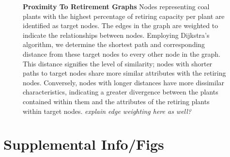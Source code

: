 \documentclass{article}
\begin{document}
\begin{figure}[H]
    \caption{\textbf{Proximity To Retirement Graphs} Nodes representing coal plants with the highest percentage of retiring capacity per plant are identified as target nodes. The edges in the graph are weighted to indicate the relationships between nodes. Employing Dijkstra's algorithm, we determine the shortest path and corresponding distance from these target nodes to every other node in the graph.
    This distance signifies the level of similarity; nodes with shorter paths to target nodes share more similar attributes with the retiring nodes. Conversely, nodes with longer distances have more dissimilar characteristics, indicating a greater divergence between the plants contained within them and the attributes of the retiring plants within target nodes. \textit{explain edge weighting here as well?}}
    \label{fig:3}
\end{figure}



\section{Supplemental Info/Figs}


%     
\end{document}
